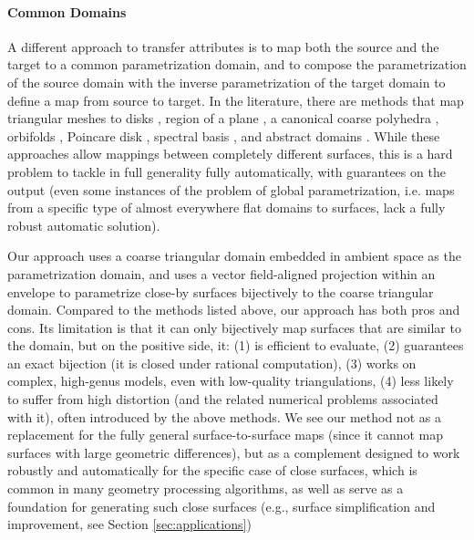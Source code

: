 \paragraph{Common Domains}

A different approach to transfer attributes is to map both the source and the target to a common parametrization domain, and to compose the parametrization of the source domain with the inverse parametrization of the target domain to define a map from source to target. In the literature, there are methods that map triangular meshes to disks \cite{Tutte:1963,Floater:97}, region of a plane 
\cite{maron2017convolutional,Aigerman:2015b,Aigerman:2014,Schuller:2013,Smith:2015,Rabinovich:2017,jiang2017simplicial,Weber:2014,Campen:2016,Muller:2015,Gotsman:2001,surazhsky2001morphing,Zhang:2005,Fu:2016,litke2005image,schmidt2019distortion}, a canonical coarse polyhedra \cite{kraevoy2004cross,praun2001consistent}, orbifolds \cite{Aigerman:2015,Aigerman:2017,Aigerman:2016}, Poincare disk \cite{Springborn:2008,stephenson2005introduction,Kharevych:2006,Jin:2008}, spectral basis \cite{Ovsjanikov:2012,Shoham:2019,Ovsjanikov:2017}, and abstract domains \cite{kraevoy2004cross,Schreiner:2004,Pietroni:2010}.
While these approaches allow mappings between completely different surfaces, this is a hard problem to tackle in full generality fully automatically, with guarantees on the output (even some instances of the problem of global parametrization, i.e. maps from a specific type of almost everywhere flat domains to surfaces, lack a fully robust automatic solution).

%
Our approach uses a coarse triangular domain embedded in ambient space as the parametrization domain, and uses a vector field-aligned projection within an envelope to parametrize close-by surfaces bijectively to the coarse triangular domain. Compared to the methods listed above, our approach has both pros and cons. Its limitation is that it can only bijectively map surfaces that are similar to the domain, but on the positive side, it: (1) is efficient to evaluate, (2)  guarantees an exact bijection (it is closed under rational computation), (3)  works on complex, high-genus models, even with low-quality triangulations, (4) less likely to suffer from high distortion (and the related numerical problems associated with it), often introduced by the above methods.
 We see our method not as a replacement for the fully general surface-to-surface maps (since it cannot map surfaces with large geometric differences), but as a complement designed to work robustly and automatically for the specific case of close surfaces, which is common in many geometry processing algorithms, as well as serve as a foundation for generating such close surfaces (e.g., surface simplification and improvement, see Section \ref{sec:applications})

